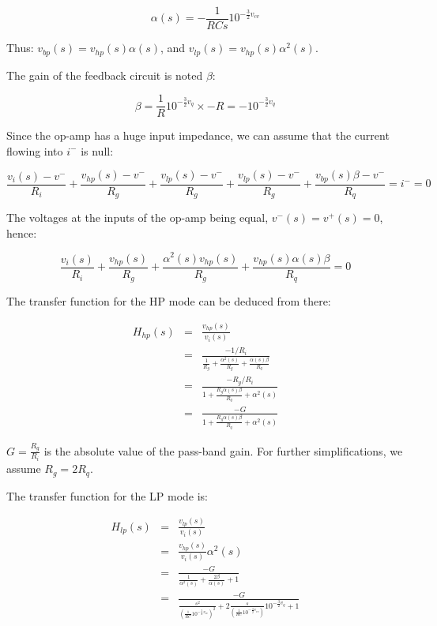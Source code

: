 \documentclass[a4paper,11pt]{article}
\begin{document}
\begin{equation}
\alpha(s) = -\frac{1}{RCs} 10^{-\frac{3}{2} v_{cv}}
\end{equation}

Thus: $v_{bp}(s) = v_{hp}(s) \alpha(s)$, and $v_{lp}(s) = v_{hp}(s) \alpha^2(s)$.

The gain of the feedback circuit is noted $\beta$:

\begin{equation}
\beta = \frac{1}{R} 10^{-\frac{3}{2} v_{q}} \times -R = -10^{-\frac{3}{2} v_{q}}
\end{equation}

Since the op-amp has a huge input impedance, we can assume that the current flowing into $i^-$ is null:

\begin{equation}
\frac{v_i(s) - v^-}{R_i} + \frac{v_{hp}(s) - v^-}{R_g} + \frac{v_{lp}(s) - v^-}{R_g} + \frac{v_{lp}(s) - v^-}{R_g} + \frac{v_{bp}(s) \beta - v^-}{R_q} = i^- = 0
\end{equation}


The voltages at the inputs of the op-amp being equal, $v^-(s) = v^+(s) = 0$, hence:

\begin{equation}
\frac{v_i(s)}{R_i} + \frac{v_{hp}(s)}{R_g} + \frac{\alpha^2(s) v_{hp}(s)}{R_g} + \frac{v_{hp}(s) \alpha(s) \beta}{R_q} = 0
\end{equation}

The transfer function for the HP mode can be deduced from there:

\begin{eqnarray}
H_{hp}(s) &=& \frac{v_{hp}(s)}{v_i(s)} \\
 &=& \frac{-1 / R_i}{\frac{1}{R_g} + \frac{\alpha^2(s)}{R_g} + \frac{\alpha(s)\beta}{R_q}} \\
 &=& \frac{-R_g / R_i}{1 + \frac{R_g \alpha(s)\beta}{R_q} + \alpha^2(s)} \\
 &=& \frac{-G}{1 + \frac{R_g \alpha(s)\beta}{R_q} + \alpha^2(s)}
\end{eqnarray}

$G = \frac{R_g}{R_i}$ is the absolute value of the pass-band gain. For further simplifications, we assume $R_g = 2 R_q$.

The transfer function for the LP mode is:

\begin{eqnarray}
H_{lp}(s) &=& \frac{v_{lp}(s)}{v_i(s)} \\
 &=& \frac{v_{hp}(s)}{v_i(s)} \alpha^2(s) \\
 &=& \frac{-G}{\frac{1}{\alpha^2(s)} + \frac{2\beta}{\alpha(s)} + 1} \\
 &=& \frac{-G}{\frac{s^2}{{\left(\frac{1}{RC} 10 ^ {-\frac{3}{2} v_{cv}}\right)}^2} + 2 \frac{s}{{\left(\frac{1}{RC} 10 ^ {-\frac{3}{2} v_{cv}}\right)}} 10^{-\frac{3}{2} v_{q}} + 1}
\end{eqnarray}
\end{document}
